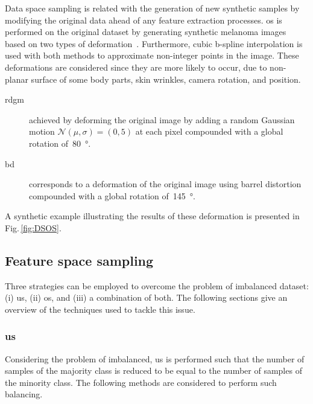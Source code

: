 Data space sampling is related with the generation of new synthetic samples by modifying the original data ahead of any feature extraction processes. 
\Ac{os} is performed on the original dataset by generating synthetic melanoma images based on two types of deformation~\cite{rastgoo2015ensemble}. Furthermore, cubic b-spline interpolation is used with both methods to approximate non-integer points in the image.
These deformations are considered since they are more likely to occur, due to non-planar surface of some body parts, skin wrinkles, camera rotation, and position. 

 
\begin{description}
	\item[\Ac{rdgm}] achieved by deforming the original image by adding a random Gaussian motion $\mathcal{N}(\mu, \sigma) = (0,5)$ at each pixel compounded with a global rotation of~\SI{80}{\degree}.
	\item[\Ac{bd}] corresponds to a deformation of the original image using barrel distortion compounded with a global rotation of~\SI{145}{\degree}.
\end{description}
A synthetic example illustrating the results of these deformation is presented in Fig.\,\ref{fig:DSOS}.

\subsection{Feature space sampling}

Three strategies can be employed to overcome the problem of imbalanced dataset: (i) \ac{us}, (ii) \ac{os}, and (iii) a combination of both.
The following sections give an overview of the techniques used to tackle this issue.

\subsubsection{\acl{us}}

Considering the problem of imbalanced, \ac{us} is performed such that the number of samples of the majority class is reduced to be equal to the number of samples of the minority class.
The following methods are considered to perform such balancing.


